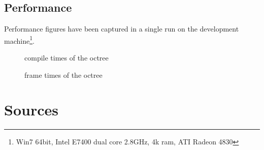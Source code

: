 \documentclass[a4, 12pt]{scrartcl}
\begin{document}
\subsection{Performance}
Performance figures have been captured in a single run on the development machine\footnote{Win7 64bit, Intel E7400 dual core 2.8GHz, 4k ram, ATI Radeon 4830}.


\begin{figure}
\centering
\begin{scriptsize}

\end{scriptsize}
\caption{compile times of the octree}
\end{figure}

\begin{figure}
\centering
\begin{scriptsize}

\end{scriptsize}
\caption{frame times of the octree}
\end{figure}


\section{Sources}






\end{document}
